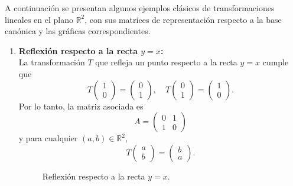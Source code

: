 \begin{example}
A continuación se presentan algunos ejemplos clásicos de transformaciones lineales en el plano $\mathbb{R}^2$, con sus matrices de representación respecto a la base canónica y las gráficas correspondientes.

\begin{enumerate}[$a)$]
    \item \textbf{Reflexión respecto a la recta $y = x$:} \\
    La transformación $T$ que refleja un punto respecto a la recta $y = x$ cumple que
    \[
    T\begin{pmatrix}1\\0\end{pmatrix} = \begin{pmatrix}0\\1\end{pmatrix}, \quad
    T\begin{pmatrix}0\\1\end{pmatrix} = \begin{pmatrix}1\\0\end{pmatrix}.
    \]
    Por lo tanto, la matriz asociada es
    \[
    A = \begin{pmatrix}0 & 1 \\ 1 & 0\end{pmatrix}
    \]
    y para cualquier $(a, b) \in \mathbb{R}^2$,
    \[
    T\begin{pmatrix}a\\b\end{pmatrix} = \begin{pmatrix}b\\a\end{pmatrix}.
    \]
    \begin{figure}[H]\centering
        \caption{Reflexión respecto a la recta $y = x$.}
    \end{figure}


\end{enumerate}
\end{example}
